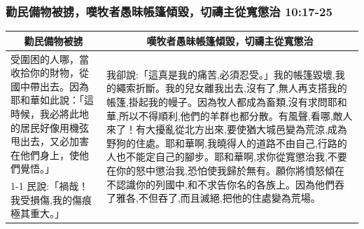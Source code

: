 \subsubsection{勸民備物被掳，嘆牧者愚昧帳篷傾毀，切禱主從寬懲治 10:17-25}
\begin{table}[H]
\centering
\begin{tabular}{p{}|p{12.750cm}}\hline\hline
\multicolumn{1}{c|}{勸民備物被掳}&\multicolumn{1}{c}{嘆牧者愚昧帳篷傾毀，切禱主從寬懲治}\\\hline
受圍困的人哪，當收拾你的財物，從國中帶出去。因為耶和華如此說：「這時候，我必將此地的居民好像用機弦甩出去，又必加害在他們身上，使他們覺悟。」
&\multirow{2}{12.8cm}{我卻說:「這真是我的痛苦,必須忍受。」我的帳篷毀壞,我的繩索折斷。我的兒女離我出去,沒有了,無人再支搭我的帳篷,掛起我的幔子。因為牧人都成為畜類,沒有求問耶和華,所以不得順利,他們的羊群也都分散。有風聲,看哪,敵人來了！有大擾亂從北方出來,要使猶大城邑變為荒涼,成為野狗的住處。耶和華啊,我曉得人的道路不由自己,行路的人也不能定自己的腳步。耶和華啊,求你從寬懲治我,不要在你的怒中懲治我,恐怕使我歸於無有。願你將憤怒傾在不認識你的列國中,和不求告你名的各族上。因為他們吞了雅各,不但吞了,而且滅絕,把他的住處變為荒場。}\\\cline{1-1}
民說:「禍哉！我受損傷,我的傷痕極其重大。」&\\\hline
\end{tabular}
\end{table}

